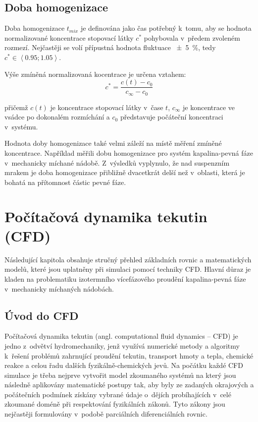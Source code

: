 \subsection{Doba homogenizace}
Doba homogenizace $t_{mix}$ je definována jako čas potřebný k~tomu, aby se hodnota normalizované koncentrace stopovací látky $c^{*}$ pohybovala v~předem zvoleném rozmezí. Nejčastěji se volí přípustná hodnota fluktuace \SI{\pm 5}{\percent}, tedy $c^{*} \in \left<\num{0.95};\num{1.05}\right>$. 

Výše zmíněná normalizovaná kocentrace je určena vztahem:
\begin{equation}
	c^{*} = \frac{c(t) - c_{0}}{c_{\infty} - c_{0}}
	\label{eq:bezkon}
\end{equation}

\noindent přičemž $c(t)$ je koncentrace stopovací látky v~čase $t$, $c_{\infty}$ je koncentrace ve vsádce po dokonalém rozmíchání a $c_{0}$ představuje počáteční koncentraci v~systému.  

Hodnota doby homogenizace také velmi záleží na místě měření zmíněné koncentrace. Například \citet{buj99} měřili dobu homogenizace pro systém kapalina-pevná fáze v~mechanicky míchané nádobě. Z~výsledků vyplynulo, že nad suspenzním mrakem je doba homogenizace přibližně dvacetkrát delší než v~oblasti, která je bohatá na přítomnost částic pevné fáze.

\section{Počítačová dynamika tekutin (CFD)}
Následující kapitola obsahuje stručný přehled základních rovnic a matematických modelů, které jsou uplatněny při simulaci pomocí techniky CFD. Hlavní důraz je kladen na problematiku izotermního vícefázového proudění kapalina-pevná fáze v~mechanicky míchaných nádobách.

\subsection{Úvod do CFD}
Počítačová dynamika tekutin (angl. computational fluid dynamics -- CFD) je jedno z~odvětví hydromechaniky, jenž využívá numerické metody a algoritmy k~řešení problémů zahrnující proudění tekutin, transport hmoty a tepla, chemické reakce a celou řadu dalších fyzikálně-chemických jevů. Na počátku každé CFD simulace je třeba nejprve vytvořit model zkoumaného systémů na který jsou následně aplikovány matematické postupy tak, aby byly ze zadaných okrajových a počátečních podmínek získány vybrané údaje o~dějích probíhajících v~celé zkoumané doméně při respektování fyzikálních zákonů. Tyto zákony jsou nejčastěji formulovány v~podobě parciálních diferenciálních rovnic. 

